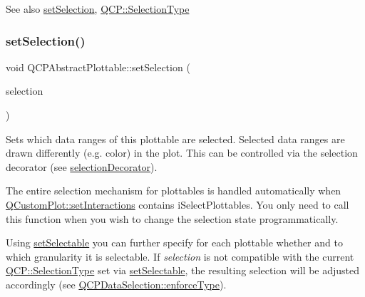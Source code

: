 \begin{DoxySeeAlso}{See also}
\hyperlink{class_q_c_p_abstract_plottable_a219bc5403a9d85d3129165ec3f5ae436}{set\+Selection}, \hyperlink{namespace_q_c_p_ac6cb9db26a564b27feda362a438db038}{Q\+C\+P\+::\+Selection\+Type} 
\end{DoxySeeAlso}
\mbox{\label{class_q_c_p_abstract_plottable_a219bc5403a9d85d3129165ec3f5ae436}} 
\subsubsection{\texorpdfstring{set\+Selection()}{setSelection()}}
{\footnotesize\ttfamily void Q\+C\+P\+Abstract\+Plottable\+::set\+Selection (\begin{DoxyParamCaption}\item[{\hyperlink{class_q_c_p_data_selection}{Q\+C\+P\+Data\+Selection}}]{selection }\end{DoxyParamCaption})}

Sets which data ranges of this plottable are selected. Selected data ranges are drawn differently (e.\+g. color) in the plot. This can be controlled via the selection decorator (see \hyperlink{class_q_c_p_abstract_plottable_a7861518e47ca0c6a0c386032c2db075e}{selection\+Decorator}).

The entire selection mechanism for plottables is handled automatically when \hyperlink{class_q_custom_plot_a5ee1e2f6ae27419deca53e75907c27e5}{Q\+Custom\+Plot\+::set\+Interactions} contains i\+Select\+Plottables. You only need to call this function when you wish to change the selection state programmatically.

Using \hyperlink{class_q_c_p_abstract_plottable_ac238d6e910f976f1f30d41c2bca44ac3}{set\+Selectable} you can further specify for each plottable whether and to which granularity it is selectable. If {\itshape selection} is not compatible with the current \hyperlink{namespace_q_c_p_ac6cb9db26a564b27feda362a438db038}{Q\+C\+P\+::\+Selection\+Type} set via \hyperlink{class_q_c_p_abstract_plottable_ac238d6e910f976f1f30d41c2bca44ac3}{set\+Selectable}, the resulting selection will be adjusted accordingly (see \hyperlink{class_q_c_p_data_selection_a17b84d852911531d229f4a76aa239a75}{Q\+C\+P\+Data\+Selection\+::enforce\+Type}).

